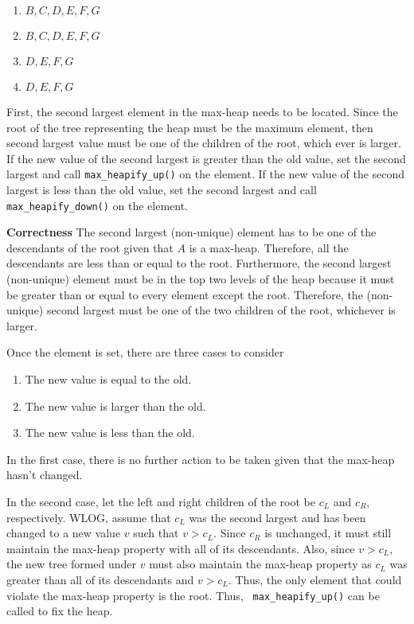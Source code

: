 \documentclass[12pt,twoside]{article}
\begin{document}
\begin{problems}
\begin{problemparts}
\begin{enumerate}
        \item $ B, C, D, E, F, G $
        \item $ B, C, D, E, F, G $
        \item $ D, E, F, G $
        \item $ D, E, F, G $
    \end{enumerate}
 First, the second largest element in the
    max-heap needs to be located. Since the root of the tree representing the
    heap must be the maximum element, then second largest value must be one
    of the children of the root, which ever is larger. If the new value of
    the second largest is greater than the old value, set the second largest
    and call {\tt max\_heapify\_up()} on the element. If the new value of the
    second largest is less than the old value, set the second largest and
    call {\tt max\_heapify\_down()} on the element.

    \smallbreak

    {\bf Correctness} The second largest (non-unique) element has to be one
    of the descendants of the root given that $ A $ is a max-heap. Therefore,
    all the descendants are less than or equal to the root. Furthermore, the
    second largest (non-unique) element must be in the top two levels of the
    heap because it must be greater than or equal to every element except the
    root. Therefore, the (non-unique) second largest must be one of the two
    children of the root, whichever is larger.

    Once the element is set, there are three cases to consider
    \begin{enumerate}
        \item The new value is equal to the old.
        \item The new value is larger than the old.
        \item The new value is less than the old.
    \end{enumerate}

    In the first case, there is no further action to be taken given that the
    max-heap hasn't changed.

    In the second case, let the left and right children of the root be $ c_L
    $ and $ c_R $, respectively. WLOG, assume that $ c_L $ was the second
    largest and has been changed to a new value $ v $ such that $ v > c_L $.
    Since $ c_R $ is unchanged, it must still maintain the max-heap property
    with all of its descendants. Also, since $ v > c_L $, the new tree formed
    under $ v $ must also maintain the max-heap property as $ c_L $ was
    greater than all of its descendants and $ v > c_L $. Thus, the only
    element that could violate the max-heap property is the root. Thus, {\tt
    max\_heapify\_up()} can be called to fix the heap.
    

\end{problemparts}
\end{problems}
\end{document}
